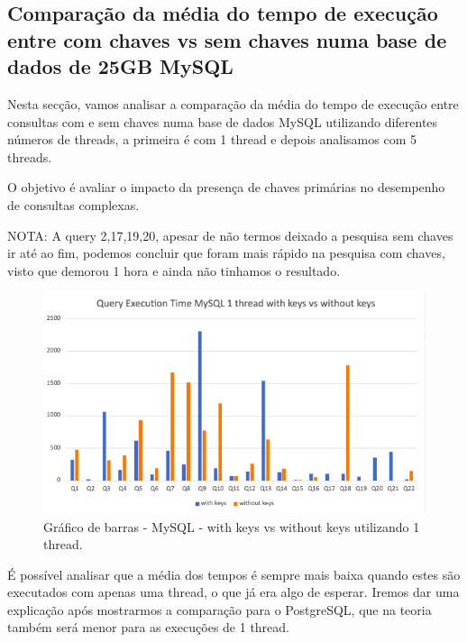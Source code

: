 \documentclass{article}
\begin{document}
\subsection{Comparação da média do tempo de execução entre com chaves vs sem chaves numa base de dados de 25GB MySQL}

Nesta secção, vamos analisar a comparação da média do tempo de execução entre consultas com e sem chaves numa base de dados MySQL utilizando diferentes números de threads, a primeira é com 1 thread e depois analisamos com 5 threads.

O objetivo é avaliar o impacto da presença de chaves primárias no desempenho de consultas complexas.

NOTA: A query 2,17,19,20, apesar de não termos deixado a pesquisa sem chaves ir até ao fim, podemos concluir que foram mais rápido na pesquisa com chaves, visto que demorou 1 hora e ainda não tinhamos o resultado.


\begin{figure}[H]
  \centering
  \includegraphics[width=\textwidth]{Graphs/mysqlonethread_withkeysvswithoutkeys.png}
  \caption{Gráfico de barras - MySQL - with keys vs without keys utilizando 1 thread.} 
  \label{fig:PKCreation2}
\end{figure}


\quad É possível analisar que a média dos tempos é sempre mais baixa quando estes são executados com apenas uma thread, o que já era algo de esperar. Iremos dar uma explicação após mostrarmos a comparação para o PostgreSQL, que na teoria também será menor para as execuções de 1 thread.
\end{document}
